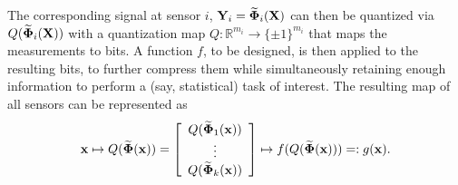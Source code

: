 The corresponding signal at sensor $i$, $\mathbf{Y}_i = \widetilde{\mathbf{\Phi}}_i (\mathbf{X})$ can then be quantized via ${Q}(\widetilde{\mathbf{\Phi}}_i (\mathbf{X}))$ with a quantization map $Q: \mathbb{R}^{m_i} \to \{\pm 1\}^{m_i} $ that maps the measurements to bits. A function $f$, to be designed, is then applied to the resulting bits, to further compress them while simultaneously retaining enough information to perform a (say, statistical) task of interest.  The resulting map of all sensors can be represented as
\begin{equation}\label{eq:binaryembedding}
\x 
\mapsto Q(\widetilde\transfer (\x)) =\left[ \begin{array}{c} Q(\widetilde\transfer_1 (\x)) \\ \vdots \\ Q(\widetilde\transfer_k (\x)) \end{array}\right] \mapsto f(Q(\widetilde\transfer (\x)))=: g(\x).%
\end{equation}




